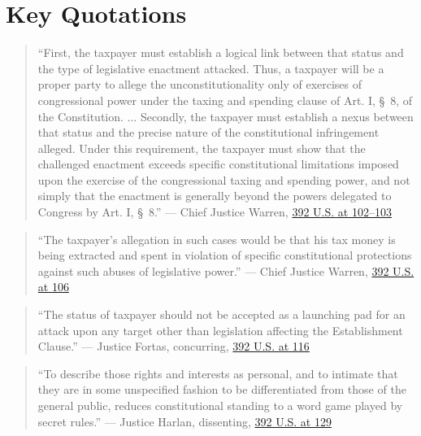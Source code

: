 \documentclass[12pt]{article}
\begin{document}
\section{Key Quotations}
\begin{quote}
``First, the taxpayer must establish a logical link between that status and the type of legislative enactment attacked. Thus, a taxpayer will be a proper party to allege the unconstitutionality only of exercises of congressional power under the taxing and spending clause of Art. I, \S\ 8, of the Constitution. ... Secondly, the taxpayer must establish a nexus between that status and the precise nature of the constitutional infringement alleged. Under this requirement, the taxpayer must show that the challenged enactment exceeds specific constitutional limitations imposed upon the exercise of the congressional taxing and spending power, and not simply that the enactment is generally beyond the powers delegated to Congress by Art. I, \S\ 8.'' --- Chief Justice Warren, \href{https://supreme.justia.com/cases/federal/us/392/83/}{392 U.S. at 102--103}
\end{quote}

\begin{quote}
``The taxpayer's allegation in such cases would be that his tax money is being extracted and spent in violation of specific constitutional protections against such abuses of legislative power.'' --- Chief Justice Warren, \href{https://supreme.justia.com/cases/federal/us/392/83/}{392 U.S. at 106}
\end{quote}

\begin{quote}
``The status of taxpayer should not be accepted as a launching pad for an attack upon any target other than legislation affecting the Establishment Clause.'' --- Justice Fortas, concurring, \href{https://supreme.justia.com/cases/federal/us/392/83/}{392 U.S. at 116}
\end{quote}

\begin{quote}
``To describe those rights and interests as personal, and to intimate that they are in some unspecified fashion to be differentiated from those of the general public, reduces constitutional standing to a word game played by secret rules.'' --- Justice Harlan, dissenting, \href{https://supreme.justia.com/cases/federal/us/392/83/}{392 U.S. at 129}
\end{quote}
\end{document}
